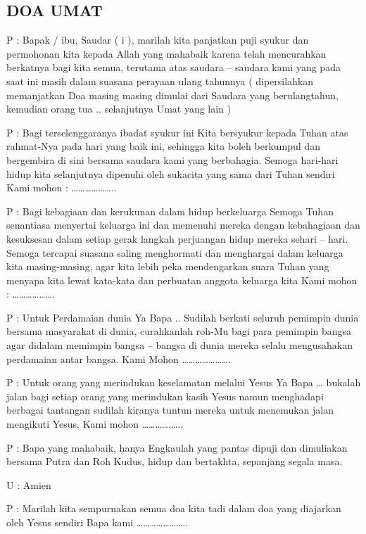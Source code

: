 \documentclass{article}
\begin{document}
\subsection{DOA UMAT}
P : Bapak / ibu, Saudar ( i ), marilah kita panjatkan puji syukur dan permohonan kita kepada Allah yang mahabaik karena
telah mencurahkan berkatnya bagi kita semua, terutama atas saudara -- saudara kami yang pada saat ini masih dalam
suasana perayaan ulang tahunnya  ( dipersilahkan memanjatkan Doa masing masing dimulai dari Saudara yang berulangtahun,
kemudian orang tua .. selanjutnya Umat yang lain )  

P : Bagi terselenggaranya ibadat syukur ini Kita bersyukur kepada Tuhan atas rahmat-Nya pada hari yang baik ini,
sehingga kita boleh berkumpul dan bergembira di sini bersama saudara kami yang berbahagia. Semoga hari-hari hidup kita
selanjutnya dipenuhi oleh sukacita yang sama dari Tuhan sendiri Kami mohon :
{\dots}{\dots}{\dots}{\dots}{\dots}{\dots}..  

P : Bagi kebagiaan dan kerukunan dalam hidup berkeluarga Semoga Tuhan senantiasa menyertai keluarga ini dan memenuhi
mereka dengan kebahagiaan dan kesuksesan dalam setiap gerak langkah perjuangan hidup mereka sehari -- hari. Semoga
tercapai suasana saling menghormati dan menghargai dalam keluarga kita masing-masing, agar kita lebih peka mendengarkan
suara Tuhan yang menyapa kita lewat kata-kata dan perbuatan anggota keluarga kita Kami mohon :
{\dots}{\dots}{\dots}{\dots}{\dots}{\dots}.  

P : Untuk Perdamaian dunia Ya Bapa .. Sudilah berkati seluruh pemimpin dunia bersama masyarakat di dunia, curahkanlah
roh-Mu bagi para pemimpin bangsa agar didalam memimpin bangsa -- bangsa di dunia mereka selalu mengusahakan perdamaian
antar bangsa. Kami Mohon {\dots}{\dots}{\dots}{\dots}{\dots}{\dots}{\dots}.  

P : Untuk orang yang merindukan keselamatan melalui Yesus Ya Bapa {\dots} bukalah jalan bagi setiap orang yang
merindukan kasih Yesus namun menghadapi berbagai tantangan sudilah kiranya tuntun mereka untuk menemukan jalan
mengikuti Yesus. Kami mohon {\dots}{\dots}{\dots}{\dots}.{\dots}..  

P : Bapa yang mahabaik, hanya Engkaulah yang pantas dipuji dan dimuliakan bersama Putra dan Roh Kudus, hidup dan
bertakhta, sepanjang segala masa.  

U : Amien  

P : Marilah kita sempurnakan semua doa kita tadi dalam doa yang diajarkan oleh Yesus sendiri Bapa kami
{\dots}{\dots}{\dots}{\dots}{\dots}{\dots}{\dots}..   
\end{document}
